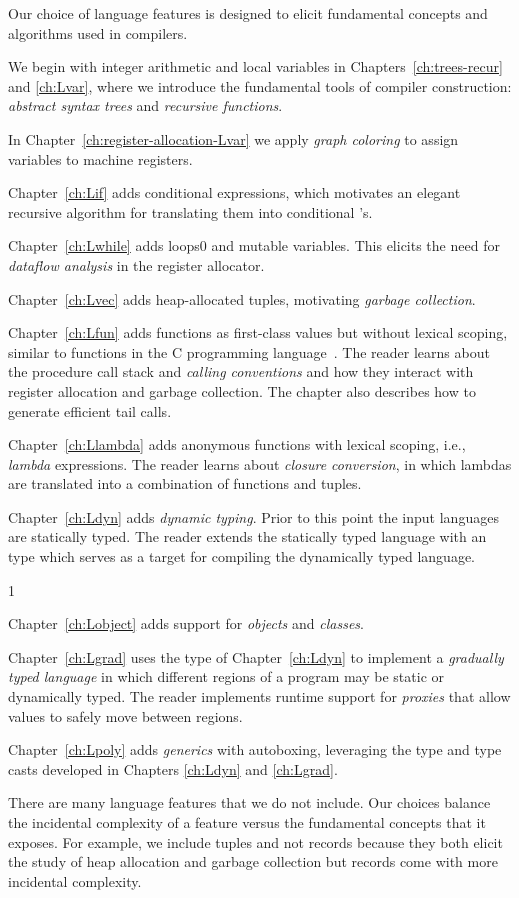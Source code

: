 \documentclass[7x10,nocrop]{TimesAPriori_MIT}%
\def\racketEd{0}
\def\pythonEd{1}
\def\edition{0}
\newcommand{\racket}[1]{{\if\edition\racketEd{#1}\fi}}
\begin{document}
Our choice of language features is designed to elicit fundamental
concepts and algorithms used in compilers.
\begin{itemize}
\item We begin with integer arithmetic and local variables in
  Chapters~\ref{ch:trees-recur} and \ref{ch:Lvar}, where we introduce
  the fundamental tools of compiler construction: \emph{abstract
    syntax trees} and \emph{recursive functions}. 
\item In Chapter~\ref{ch:register-allocation-Lvar} we apply
  \emph{graph coloring} to assign variables to machine registers.
\item Chapter~\ref{ch:Lif} adds conditional expressions, which
  motivates an elegant recursive algorithm for translating them into
  conditional 's.
\item Chapter~\ref{ch:Lwhile} adds loops\racket{ and mutable
  variables}. This elicits the need for \emph{dataflow
    analysis} in the register allocator.
\item Chapter~\ref{ch:Lvec} adds heap-allocated tuples, motivating
  \emph{garbage collection}.
\item Chapter~\ref{ch:Lfun} adds functions as first-class values but
  without lexical scoping, similar to functions in the C programming
  language~\citep{Kernighan:1988nx}. The reader learns about the
  procedure call stack and \emph{calling conventions} and how they interact
  with register allocation and garbage collection. The chapter also
  describes how to generate efficient tail calls.
\item Chapter~\ref{ch:Llambda} adds anonymous functions with lexical
  scoping, i.e., \emph{lambda} expressions. The reader learns about
  \emph{closure conversion}, in which lambdas are translated into a
  combination of functions and tuples.
\item Chapter~\ref{ch:Ldyn} adds \emph{dynamic typing}. Prior to this
  point the input languages are statically typed.  The reader extends
  the statically typed language with an  type which serves
  as a target for compiling the dynamically typed language.
{\if\edition\pythonEd
\item Chapter~\ref{ch:Lobject} adds support for \emph{objects} and
  \emph{classes}.
\fi}
\item Chapter~\ref{ch:Lgrad} uses the  type of
  Chapter~\ref{ch:Ldyn} to implement a \emph{gradually typed language}
  in which different regions of a program may be static or dynamically
  typed. The reader implements runtime support for \emph{proxies} that
  allow values to safely move between regions.
\item Chapter~\ref{ch:Lpoly} adds \emph{generics} with autoboxing,
  leveraging the  type and type casts developed in Chapters
  \ref{ch:Ldyn} and \ref{ch:Lgrad}.
\end{itemize}
There are many language features that we do not include. Our choices
balance the incidental complexity of a feature versus the fundamental
concepts that it exposes. For example, we include tuples and not
records because they both elicit the study of heap allocation and
garbage collection but records come with more incidental complexity.
\end{document}
